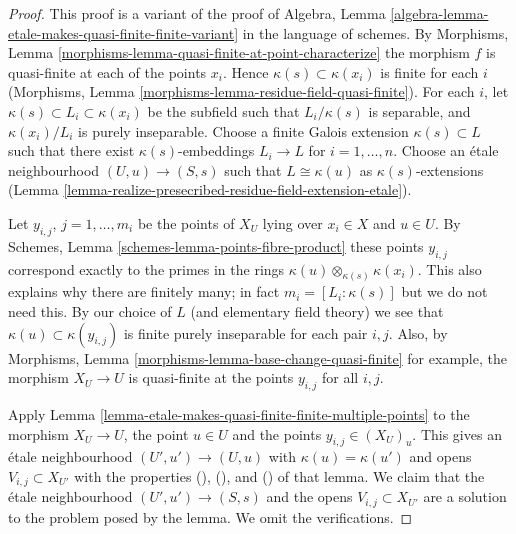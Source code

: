 \begin{proof}
This proof is a variant of the proof of
Algebra, Lemma \ref{algebra-lemma-etale-makes-quasi-finite-finite-variant}
in the language of schemes.
By Morphisms, Lemma \ref{morphisms-lemma-quasi-finite-at-point-characterize}
the morphism $f$ is quasi-finite at each of the points $x_i$.
Hence $\kappa(s) \subset \kappa(x_i)$ is finite for each $i$
(Morphisms, Lemma \ref{morphisms-lemma-residue-field-quasi-finite}).
For each $i$, let $\kappa(s) \subset L_i \subset \kappa(x_i)$
be the subfield such that $L_i/\kappa(s)$ is separable, and
$\kappa(x_i)/L_i$ is purely inseparable. Choose a finite Galois
extension $\kappa(s) \subset L$ such that there exist
$\kappa(s)$-embeddings $L_i \to L$ for $i = 1, \ldots, n$.
Choose an \'etale neighbourhood $(U, u) \to (S, s)$ such that
$L \cong \kappa(u)$ as $\kappa(s)$-extensions
(Lemma \ref{lemma-realize-presecribed-residue-field-extension-etale}).

\medskip\noindent
Let $y_{i, j}$, $j = 1, \ldots, m_i$ be the points of $X_U$
lying over $x_i \in X$ and $u \in U$. By
Schemes, Lemma \ref{schemes-lemma-points-fibre-product}
these points $y_{i, j}$ correspond exactly to the primes in the rings
$\kappa(u) \otimes_{\kappa(s)} \kappa(x_i)$. This also
explains why there are finitely many; in fact
$m_i = [L_i : \kappa(s)]$ but we do not need this.
By our choice of
$L$ (and elementary field theory)
we see that $\kappa(u) \subset \kappa(y_{i, j})$ is
finite purely inseparable for each pair $i, j$.
Also, by Morphisms, Lemma \ref{morphisms-lemma-base-change-quasi-finite}
for example, the morphism
$X_U \to U$ is quasi-finite at the points $y_{i, j}$ for
all $i, j$.

\medskip\noindent
Apply Lemma \ref{lemma-etale-makes-quasi-finite-finite-multiple-points}
to the morphism $X_U \to U$, the point $u \in U$
and the points $y_{i, j} \in (X_U)_u$. This gives an \'etale neighbourhood
$(U', u') \to (U, u)$ with $\kappa(u) = \kappa(u')$ and
opens $V_{i, j} \subset X_{U'}$ with the properties
(), (), and ()
of that lemma. We claim that the \'etale neighbourhood
$(U', u') \to (S, s)$ and the opens $V_{i, j} \subset X_{U'}$
are a solution to the problem posed by the lemma.
We omit the verifications.
\end{proof}

